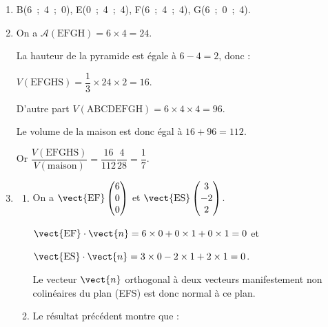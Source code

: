 \begin{enumerate}
\item %
B(6~;~4~;~0), \quad E(0~;~4~;~4), \quad F(6~;~4~;~4), \quad G(6~;~0~;~4).
\item %


On a $\mathcal{A}(\text{EFGH}) = 6 \times 4 = 24$.

La hauteur de la pyramide est égale à $6 - 4 = 2$, donc :

$V(\text{EFGHS}) = \dfrac13 \times 24 \times 2 = 16$.

D'autre part $V(\text{ABCDEFGH})  = 6 \times 4 \times 4 = 96$.

Le volume de la maison est donc égal à $16 + 96 = 112$.

Or $\dfrac{V(\text{EFGHS})}{V(\text{maison})} = \dfrac{16}{112}\dfrac{4}{28} = \dfrac{1}{7}$.
\item 
	\begin{enumerate}
		\item %
		On a $\vect{\text{EF}}\begin{pmatrix}6\\0\\0\end{pmatrix}$ et $\vect{\text{ES}}\begin{pmatrix}3\\-2\\2\end{pmatrix}$.
		
$\vect{\text{EF}}\cdot \vect{n} = 6 \times 0 + 0 \times 1 + 0 \times 1 = 0$ et 

$\vect{\text{ES}}\cdot \vect{n} = 3 \times 0 - 2 \times 1 + 2 \times 1 = 0$.

Le vecteur $\vect{n}$ orthogonal à deux vecteurs manifestement non colinéaires du plan (EFS) est donc normal à ce plan.
		\item %
		Le résultat précédent montre que :
		

\end{enumerate}
\end{enumerate}
